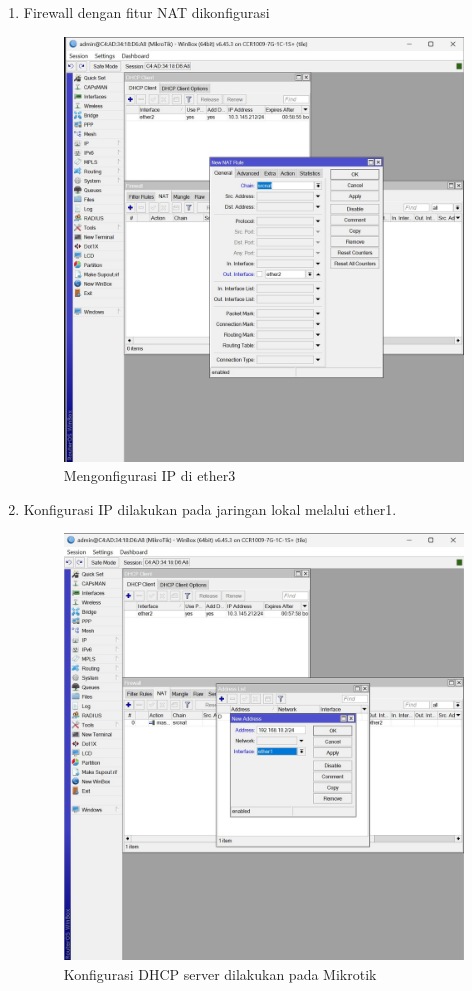 \begin{enumerate}
    \item Firewall dengan fitur NAT dikonfigurasi
    \begin{figure}[H]
        \centering
        \includegraphics[width=0.5\linewidth]{P1/img/gambar3.jpeg}
        \caption{Mengonfigurasi IP di ether3}
        \label{fig:Firewall-NAT}
    \end{figure}
    
    \item Konfigurasi IP dilakukan pada jaringan lokal melalui ether1.
    \begin{figure}[H]
        \centering
        \includegraphics[width=0.5\linewidth]{P1/img/gambar4.jpeg}
        \caption{Konfigurasi DHCP server dilakukan pada Mikrotik}
        \label{fig:Alamat-IP-ether}
    \end{figure}
    

\end{enumerate}
